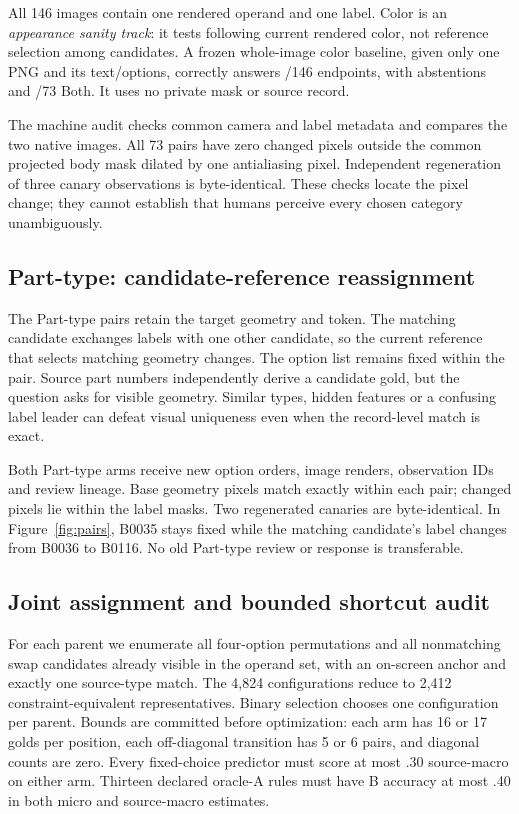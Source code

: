 \documentclass[10pt,twocolumn,letterpaper]{article}
\begin{document}
All 146 images contain one rendered operand and one label. Color is an
\emph{appearance sanity track}: it tests following current rendered color,
not reference selection among candidates. A frozen whole-image color
baseline, given only one PNG and its text/options, correctly answers
\EvColorBaselineCorrect/146 endpoints, with
\EvColorBaselineAbstentions{} abstentions and
\EvColorBaselineBothHits/73 Both. It uses no private mask or source record.

The machine audit checks common camera and label metadata and compares
the two native images. All 73 pairs have zero changed pixels outside
the common projected body mask dilated by one antialiasing pixel.
Independent regeneration of three canary observations is byte-identical.
These checks locate the pixel change; they cannot establish that
humans perceive every chosen category unambiguously.

\subsection{Part-type: candidate-reference reassignment}
The \EvType{} Part-type pairs retain the target geometry and token.
The matching candidate exchanges labels with one other candidate,
so the current reference that selects matching geometry changes.
The option list remains fixed within the pair. Source part numbers
independently derive a candidate gold, but the question asks for visible
geometry. Similar types, hidden features or a confusing label leader
can defeat visual uniqueness even when the record-level match is exact.

Both Part-type arms receive new option orders, image renders, observation
IDs and review lineage. Base geometry pixels match exactly within each
pair; changed pixels lie within the label masks. Two regenerated
canaries are byte-identical. In Figure~\ref{fig:pairs}, B0035 stays fixed
while the matching candidate's label changes from B0036 to B0116.
No old Part-type review or response is transferable.

\subsection{Joint assignment and bounded shortcut audit}
For each parent we enumerate all four-option permutations and all
nonmatching swap candidates already visible in the operand set, with an
on-screen anchor and exactly one source-type match. The 4,824
configurations reduce to 2,412 constraint-equivalent representatives.
Binary selection chooses one configuration per parent. Bounds are
committed before optimization: each arm has 16 or 17 golds per position,
each off-diagonal transition has 5 or 6 pairs, and diagonal counts are zero.
Every fixed-choice predictor must score at most .30 source-macro on
either arm. Thirteen declared oracle-A rules must have B accuracy at
most .40 in both micro and source-macro estimates.
\end{document}
